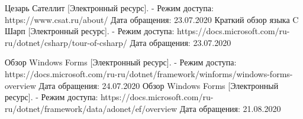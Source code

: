 \newpage

\begin{thebibliography}{}
	 Цезарь Сателлит [Электронный ресурс]. -
	Режим доступа: https://www.csat.ru/about/
	Дата обращения: 23.07.2020
	 Краткий обзор языка C Шарп [Электронный ресурс]. -
	Режим доступа: https://docs.microsoft.com/ru-ru/dotnet/csharp/tour-of-csharp/
	Дата обращения: 23.07.2020
	
	 Обзор Windows Forms [Электронный ресурс]. -
	Режим доступа: https://docs.microsoft.com/ru-ru/dotnet/framework/winforms/windows-forms-overview
	Дата обращения: 24.07.2020
	 Обзор Windows Forms [Электронный ресурс]. -
	Режим доступа: https://docs.microsoft.com/ru-ru/dotnet/framework/data/adonet/ef/overview
	Дата обращения: 21.08.2020
\end{thebibliography}